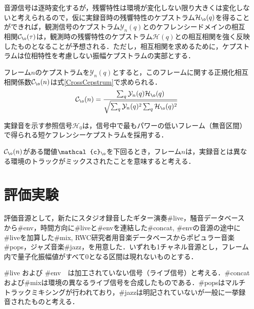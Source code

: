 \documentclass[technicalreport]{ieicej}
\begin{document}
音源信号は逐時変化するが，残響特性は環境が変化しない限り大きくは変化しない\cite{yYyOyY_ExtRTFbHSP_MASJ2014s}と考えられるので，仮に実録音時の残響特性のケプストラム$\mathcal{H}_{\o}(q)$を得ることができれば，観測信号のケプストラム$\mathcal{Y}_{n}(q)$とのケフレンシードメインの相互相関$\mathcal{C}_{\o}(\tau)$は，観測時の残響特性のケプストラム$\mathcal{H}(q)$との相互相関を強く反映したものとなることが予想される．ただし，相互相関を求めるために，ケプストラムは位相特性を考慮しない振幅ケプストラムの実部とする．

フレーム$n$のケプストラムを$\mathcal{Y}_{n}(q)$とすると，このフレームに関する正規化相互相関係数$\mathcal{C}_{\o}(n)$は式\eqref{CrossCepstrum}で求められる．
\begin{gather}
\mathcal{C}_{\o}(n) 
= \frac{%
	\sum_{q}\mathcal{Y}_{n}(q)\mathcal{H}_{\o}(q)
}{%
\sqrt{\sum_{q}\mathcal{Y}_{n}(q)^2\sum_{q}\mathcal{H}_{\o}(q)^2}
} \label{CrossCepstrum}
\end{gather}

実録音を示す参照信号$\mathcal{H}_0$は，信号中で最もパワーの低いフレーム（無音区間）で得られる短ケフレンシーケプストラムを採用する．

$\mathcal{C}_{\o}(n)$がある閾値$\mathcal{c}_{\o}$を下回るとき，フレーム$n$は，実録音とは異なる環境のトラックがミックスされたことを意味すると考える．

\section{評価実験}

評価音源として，新たにスタジオ録音したギター演奏\#live，騒音データベース\cite{souon}から\#env，時間方向に\#liveと\#envを連結した\#concat, \#envの音源の途中に\#liveを加算した\#mix, RWC研究者用音楽データベース\cite{RWCpops,RWCjazz}からポピュラー音楽\#pops，ジャズ音楽\#jazz，を用意した．いずれも1チャネル音源とし，フレーム内で量子化振幅値がすべて0となる区間は現れないものとする．

\#live および \#env　は加工されていない信号（ライブ信号）と考える．\#concatおよび\#mixは環境の異なるライブ信号を合成したものである．\#popsはマルチトラックミキシングが行われており，\#jazzは明記されていないが一般に一挙録音されたものと考える．
\end{document}
